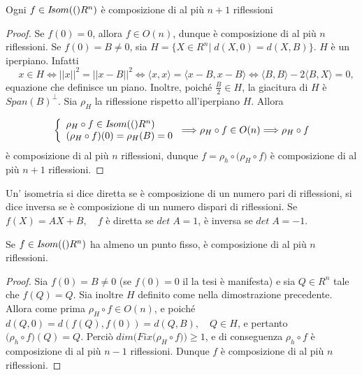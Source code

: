 \documentclass[a4paper,12pt]{article}
\newcommand{\Got}[1]{#1}
\newcommand{\got}[1]{{#1}}
\begin{document}
 \begin{theorem}
 \Got{Ogni} $\got{f\in \Isom(R^n)}$ \Got{è composizione di al più} $\got{n+1}$ \Got{riflessioni}
 \end{theorem}
 
 \begin{proof}
 \Got{Se} $\got{f(0)=0}$, \Got{allora} $\got{f\in O(n)}$, \Got{dunque è composizione di al più} $\got{n}$ 
 \Got{riflessioni.
 Se} $\got{f(0)=B\ne 0}$, \Got{sia} $\got{H=\{X\in R^n|\;d(X,0)=d(X,B)\}}$.
 $\got{H}$ \Got{è un iperpiano. Infatti} $$\quad\got{x\in H\Longleftrightarrow ||x||^2=||x-B||^2\Longleftrightarrow\langle x,x\rangle=
 \langle x-B,x-B\rangle\Longleftrightarrow\langle B,B\rangle-2\langle B,X\rangle=0},$$
 \Got{equazione che definisce un piano. Inoltre, poiché} $\got{\frac{B}{2}\in H}$, \Got{la giacitura di} $\got{H}$ \Got{è} 
 $\got{Span(B)^{\bot}}$.
 \Got{Sia} $\got{\rho_H}$ \Got{la riflessione rispetto all'iperpiano} $\got{H}$.
 \Got{Allora}
 
 \[ \left\{
 \begin{array}{l}
  \got{\rho_H}\circ\got{ f\in \Isom(R^n)} \\
  \got{(\rho_H}\circ\got{ f)(0)=\rho_H(B)=0}
 \end{array}
 \right.
 \Longrightarrow \got{\rho_H}\circ\got{ f\in O(n)\Longrightarrow \rho_H}\circ\got{ f}
 \]
 \Got{è composizione di al più} $\got{n}$ \Got{riflessioni, dunque} $\got{f=\rho_h}\circ\got{(\rho_H}\circ\got{ f)}$
 \Got{è composizione di al più} $\got{n+1}$ \Got{riflessioni}.
  \end{proof}
 
 \begin{definition}\Got{Un' isometria si dice diretta se è composizione di un numero pari di riflessioni, si dice inversa se
 è composizione di un numero dispari di riflessioni. Se} $\got{f(X)=AX+B,\quad f}$ \Got{è diretta se} $\got{det\; A=1}$,
 \Got{è inversa se} $\got{det\; A=-1}$.
 \end{definition}
 
 \begin{proposition}
 \Got{Se} $\got{f\in \Isom(R^n)}$ \Got{ha almeno un punto fisso, è composizione di al più} $\got{n}$ \Got{riflessioni}.
 \end{proposition}
 
 \begin{proof}
 \Got{Sia} $\got{f(0)=B\ne 0}$ \Got{(se} $\got{f(0)=0}$ \Got{il la tesi è manifesta) e sia} $\got{Q\in R^n}$
 \Got{tale che} $\got{f(Q)=Q}$. \Got{Sia inoltre} $\got{H}$ \Got{definito come nella dimostrazione precedente.
 Allora come prima} $\got{\rho_H}\circ\got{ f\in O(n)}$, \Got{e poiché} $\got{d(Q,0)=d(f(Q),f(0))=d(Q,B),\quad Q\in H}$, \Got{e pertanto}\\
 $\got{(\rho_h}\circ\got{ f)(Q)=Q}$.
 \Got{Perciò} $\got{dim(Fix(\rho_H}\circ\got{ f))\ge 1}$, \Got{e di conseguenza} $\got{\rho_h}\circ\got{ f}$ \Got{è composizione di al più}
 $\got{n-1}$
 \Got{riflessioni.
 Dunque} $\got{f}$ \Got{è composizione di al più} $\got{n}$ \Got{riflessioni.}
  \end{proof}
\end{document}
